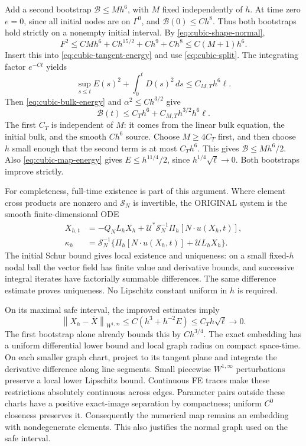 \documentclass[11pt,a4paper]{article}
\numberwithin{equation}{section}
\theoremstyle{remark}
\newcommand{\norm}[1]{\left\lVert #1\right\rVert}
\begin{document}
Add a second bootstrap \(\mathcal B\leq Mh^6\), with \(M\) fixed
independently of \(h\). At time zero \(e=0\), since all initial nodes
are on \(\Gamma^0\), and \(\mathcal B(0)\leq Ch^8\). Thus both
bootstraps hold strictly on a nonempty initial interval. By
\eqref{eq:cubic-shape-normal},
\[
 F^2\leq CMh^6+Ch^{15/2}+Ch^9+Ch^8\leq C(M+1)h^6.
\]
Insert this into \eqref{eq:cubic-tangent-energy} and use
\eqref{eq:cubic-split}. The integrating factor \(e^{-Ct}\) yields
\begin{equation}\label{eq:cubic-map-energy}
 \sup_{s\leq t}E(s)^2+\int_0^tD(s)^2\,ds
                              \leq C_{M,T}h^6\ell.
\end{equation}
Then \eqref{eq:cubic-bulk-energy} and \(\alpha^2\leq Ch^{3/2}\) give
\begin{equation}\label{eq:cubic-bulk-improvement}
       \mathcal B(t)\leq C_T h^6+C_{M,T}h^{3/2}h^6\ell.
\end{equation}
The first \(C_T\) is independent of \(M\): it comes from the linear
bulk equation, the initial bulk, and the smooth \(Ch^6\) source.
Choose \(M\geq4C_T\) first, and then choose \(h\) small enough that
the second term is at most \(C_Th^6\). This gives
\(\mathcal B\leq Mh^6/2\). Also
\eqref{eq:cubic-map-energy} gives \(E\leq h^{11/4}/2\), since
\(h^{1/4}\sqrt\ell\to0\). Both bootstraps improve strictly.

For completeness, full-time existence is part of this argument.
Where element cross products are nonzero and \(\mathcal S_N\) is
invertible, the ORIGINAL system is the smooth finite-dimensional ODE
\begin{equation}\label{eq:cubic-ODE}
 \begin{split}
 X_{h,t}&=-Q_NL_hX_h+
         \mathcal U^*\mathcal S_N^{-1}\Pi_h[N\cdot u(X_h,t)],\\
 \kappa_h&=\mathcal S_N^{-1}
             \{\Pi_h[N\cdot u(X_h,t)]+\mathcal UL_hX_h\}.
 \end{split}
\end{equation}
The initial Schur bound gives local existence and uniqueness: on a small
fixed-\(h\) nodal ball the vector field has finite value and derivative
bounds, and successive integral iterates have factorially summable
differences. The same difference estimate proves uniqueness.
No Lipschitz constant uniform in \(h\) is required.

On its maximal safe interval, the improved estimates imply
\[
 \norm{X_h-\overline X}_{W^{1,\infty}}
       \leq C(h^3+h^{-2}E)\leq C_T h\sqrt\ell\longrightarrow0.
\]
The first bootstrap alone already bounds this by \(Ch^{3/4}\).
The exact embedding has a uniform differential lower bound and local
graph radius on compact space-time. On each smaller graph chart,
project to its tangent plane and integrate the derivative difference
along line segments. Small piecewise \(W^{1,\infty}\) perturbations
preserve a local lower Lipschitz bound. Continuous FE traces make
these restrictions absolutely continuous across edges. Parameter
pairs outside these charts have a positive exact-image separation by
compactness; uniform \(C^0\) closeness preserves it. Consequently
the numerical map remains an embedding with nondegenerate elements.
This also justifies the normal graph used on the safe interval.
\end{document}
